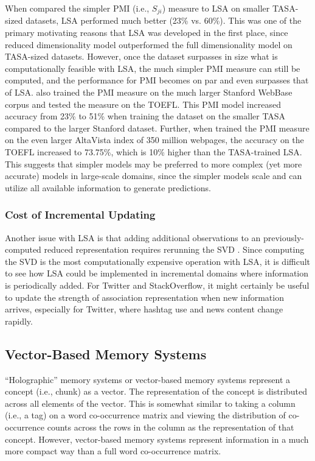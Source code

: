 \documentclass[man,floatsintext,donotrepeattitle]{apa6}
\begin{document}
When \textcite{Budiu2007} compared the simpler PMI (i.e., $S_{ji}$) measure to LSA on smaller TASA-sized datasets, LSA performed much better (23\% vs. 60\%).
This was one of the primary motivating reasons that LSA was developed in the first place, since reduced dimensionality model outperformed the full dimensionality model on TASA-sized datasets.
However, once the dataset surpasses in size what is computationally feasible with LSA, the much simpler PMI measure can still be computed, and the performance for PMI becomes on par and even surpasses that of LSA.
\textcite{Budiu2007} also trained the PMI measure on the much larger Stanford WebBase corpus and tested the measure on the TOEFL.
This PMI model increased accuracy from 23\% to 51\% when training the dataset on the smaller TASA compared to the larger Stanford dataset.
Further, when \textcite{Turney2001} trained the PMI measure on the even larger AltaVista index of 350 million webpages, the accuracy on the TOEFL increased to 73.75\%, which is 10\% higher than the TASA-trained LSA.
This suggests that simpler models may be preferred to more complex (yet more accurate) models in large-scale domains, since the simpler models scale and can utilize all available information to generate predictions.

\subsubsection{Cost of Incremental Updating}

Another issue with LSA is that adding additional observations to an previously-computed reduced representation requires rerunning the SVD \parencite{Farahat2004}.
Since computing the SVD is the most computationally expensive operation with LSA, it is difficult to see how LSA could be implemented in incremental domains where information is periodically added.
For Twitter and StackOverflow, it might certainly be useful to update the strength of association representation when new information arrives, especially for Twitter, where hashtag use and news content change rapidly.

\subsection{Vector-Based Memory Systems}

``Holographic'' memory systems \parencite{Plate1995} or vector-based memory systems represent a concept (i.e., chunk) as a vector.
The representation of the concept is distributed across all elements of the vector.
This is somewhat similar to taking a column (i.e., a tag) on a word co-occurrence matrix and viewing the distribution of co-occurrence counts across the rows in the column as the representation of that concept.
However, vector-based memory systems represent information in a much more compact way than a full word co-occurrence matrix.
\end{document}
